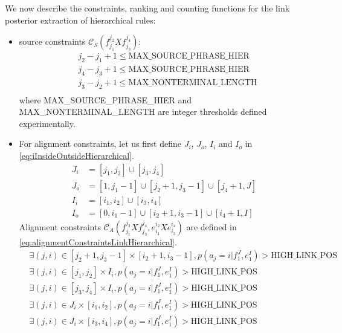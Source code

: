 %
We now describe the constraints, ranking and counting functions for the link
posterior extraction of hierarchical rules:
%
\begin{itemize}
  \item source constraints $\mathcal{C}_S(f_{j_1}^{j_2} X f_{j_3}^{j_4})$:
%
\begin{equation}
  \begin{split}
    & j_2 - j_1 + 1 \leq \mbox{MAX\_SOURCE\_PHRASE\_HIER} \\
    & j_4 - j_3 + 1 \leq \mbox{MAX\_SOURCE\_PHRASE\_HIER} \\
    & j_3 - j_2 + 1 \leq \mbox{MAX\_NONTERMINAL\_LENGTH} \\
  \end{split}
\end{equation}
%
where MAX\_SOURCE\_PHRASE\_HIER and MAX\_NONTERMINAL\_LENGTH are integer
thresholds defined experimentally.
  \item For alignment constraints, let us first define $J_i$, $J_o$, $I_i$ and
$I_o$ in \autoref{eq:iInsideOutsideHierarchical}.
%
\begin{equation}
\begin{split}
  J_i &= [j_1, j_2] \cup [j_3, j_4] \\
  J_o &= [1, j_1 - 1] \cup [j_2 + 1, j_3 - 1] \cup [j_4 + 1, J] \\
  I_i &= [i_1, i_2] \cup [i_3, i_4] \\
  I_o &= [0, i_1 - 1] \cup [i_2 + 1, i_3 - 1] \cup [i_4 + 1, I]
\end{split}
\label{eq:iInsideOutsideHierarchical}
\end{equation}
%
Alignment constraints
$\mathcal{C}_A(f_{j_1}^{j_2} X f_{j_3}^{j_4}, e_{i_1}^{i_2} X e_{i_3}^{i_4})$
are defined in \autoref{eq:alignmentConstraintsLinkHierarchical}.
%
\begin{equation}
  \begin{split}
    & \exists (j,i) \in [j_2 + 1, j_3 - 1] \times [i_2 + 1, i_3 - 1], p(a_j = i |f_1^J,e_1^I) > \mbox{HIGH\_LINK\_POS} \\
    & \exists (j,i) \in [j_1, j_2] \times I_i, p(a_j = i | f_1^J, e_1^I) > \mbox{HIGH\_LINK\_POS} \\
    & \exists (j,i) \in [j_3, j_4] \times I_i, p(a_j = i | f_1^J, e_1^I) > \mbox{HIGH\_LINK\_POS} \\
    & \exists (j,i) \in J_i \times [i_1, i_2], p(a_j = i | f_1^J, e_1^I) > \mbox{HIGH\_LINK\_POS} \\
    & \exists (j,i) \in J_i \times [i_3, i_4], p(a_j = i | f_1^J, e_1^I) > \mbox{HIGH\_LINK\_POS} \\

\end{split}
\end{equation}
\end{itemize}
